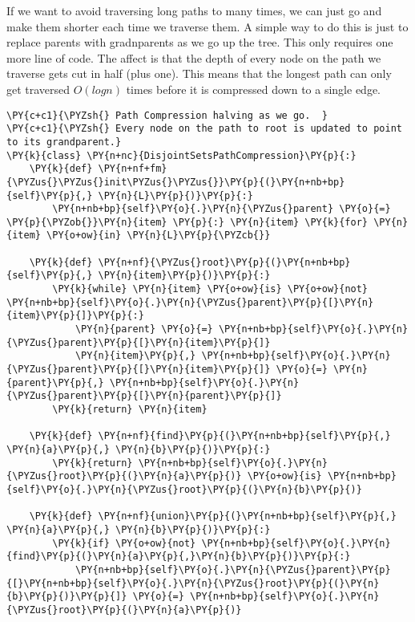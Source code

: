 If we want to avoid traversing long paths to many times, we can just go and make them shorter each time we traverse them.  A simple way to do this is just to replace parents with gradnparents as we go up the tree.  This only requires one more line of code.  The affect is that the depth of every node on the path we traverse gets cut in half (plus one).  This means that the longest path can only get traversed $O(log n)$ times before it is compressed down to a single edge.

\begin{Verbatim}[commandchars=\\\{\}]
\PY{c+c1}{\PYZsh{} Path Compression halving as we go.  }
\PY{c+c1}{\PYZsh{} Every node on the path to root is updated to point to its grandparent.}
\PY{k}{class} \PY{n+nc}{DisjointSetsPathCompression}\PY{p}{:}
    \PY{k}{def} \PY{n+nf+fm}{\PYZus{}\PYZus{}init\PYZus{}\PYZus{}}\PY{p}{(}\PY{n+nb+bp}{self}\PY{p}{,} \PY{n}{L}\PY{p}{)}\PY{p}{:}
        \PY{n+nb+bp}{self}\PY{o}{.}\PY{n}{\PYZus{}parent} \PY{o}{=} \PY{p}{\PYZob{}}\PY{n}{item} \PY{p}{:} \PY{n}{item} \PY{k}{for} \PY{n}{item} \PY{o+ow}{in} \PY{n}{L}\PY{p}{\PYZcb{}}

    \PY{k}{def} \PY{n+nf}{\PYZus{}root}\PY{p}{(}\PY{n+nb+bp}{self}\PY{p}{,} \PY{n}{item}\PY{p}{)}\PY{p}{:}
        \PY{k}{while} \PY{n}{item} \PY{o+ow}{is} \PY{o+ow}{not} \PY{n+nb+bp}{self}\PY{o}{.}\PY{n}{\PYZus{}parent}\PY{p}{[}\PY{n}{item}\PY{p}{]}\PY{p}{:}
            \PY{n}{parent} \PY{o}{=} \PY{n+nb+bp}{self}\PY{o}{.}\PY{n}{\PYZus{}parent}\PY{p}{[}\PY{n}{item}\PY{p}{]}
            \PY{n}{item}\PY{p}{,} \PY{n+nb+bp}{self}\PY{o}{.}\PY{n}{\PYZus{}parent}\PY{p}{[}\PY{n}{item}\PY{p}{]} \PY{o}{=} \PY{n}{parent}\PY{p}{,} \PY{n+nb+bp}{self}\PY{o}{.}\PY{n}{\PYZus{}parent}\PY{p}{[}\PY{n}{parent}\PY{p}{]}
        \PY{k}{return} \PY{n}{item}

    \PY{k}{def} \PY{n+nf}{find}\PY{p}{(}\PY{n+nb+bp}{self}\PY{p}{,} \PY{n}{a}\PY{p}{,} \PY{n}{b}\PY{p}{)}\PY{p}{:}
        \PY{k}{return} \PY{n+nb+bp}{self}\PY{o}{.}\PY{n}{\PYZus{}root}\PY{p}{(}\PY{n}{a}\PY{p}{)} \PY{o+ow}{is} \PY{n+nb+bp}{self}\PY{o}{.}\PY{n}{\PYZus{}root}\PY{p}{(}\PY{n}{b}\PY{p}{)}

    \PY{k}{def} \PY{n+nf}{union}\PY{p}{(}\PY{n+nb+bp}{self}\PY{p}{,} \PY{n}{a}\PY{p}{,} \PY{n}{b}\PY{p}{)}\PY{p}{:}
        \PY{k}{if} \PY{o+ow}{not} \PY{n+nb+bp}{self}\PY{o}{.}\PY{n}{find}\PY{p}{(}\PY{n}{a}\PY{p}{,}\PY{n}{b}\PY{p}{)}\PY{p}{:}
            \PY{n+nb+bp}{self}\PY{o}{.}\PY{n}{\PYZus{}parent}\PY{p}{[}\PY{n+nb+bp}{self}\PY{o}{.}\PY{n}{\PYZus{}root}\PY{p}{(}\PY{n}{b}\PY{p}{)}\PY{p}{]} \PY{o}{=} \PY{n+nb+bp}{self}\PY{o}{.}\PY{n}{\PYZus{}root}\PY{p}{(}\PY{n}{a}\PY{p}{)}
\end{Verbatim}



